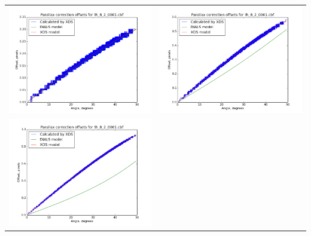 \documentclass{article}
\begin{document}
{
\centering
\begin{tabular}{cc}
\includegraphics[scale=0.3]{corrections8000.png} & 
\includegraphics[scale=0.3]{corrections10000.png} \\ 
\includegraphics[scale=0.3]{corrections12000.png} &

\end{tabular}}
\end{document}
